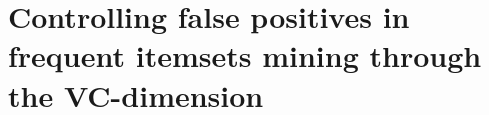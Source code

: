 \chapter{Controlling false positives in frequent itemsets mining through the
VC-dimension}\label{ch:realfis}

\newif\ifarxiv
\arxivtrue

%





%




